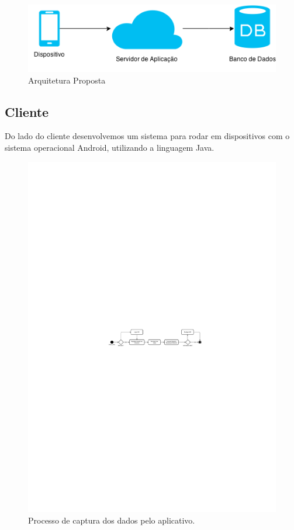\documentclass[12pt, %
openright, 
oneside,
a4paper,
brazil]{facom-ufu-abntex2}
\begin{document}
\begin{figure}[hbt]
  \includegraphics{arquiteturaProposta}
  \caption{Arquitetura Proposta}
\end{figure}


\subsection{Cliente}
Do lado do cliente desenvolvemos um sistema para rodar em dispositivos com o sistema operacional Android, utilizando a linguagem Java.

\begin{figure}[hbt]
  \includegraphics [scale=.48] {pherocast1}
  \caption{Processo de captura dos dados pelo aplicativo.}
\end{figure}
\end{document}
